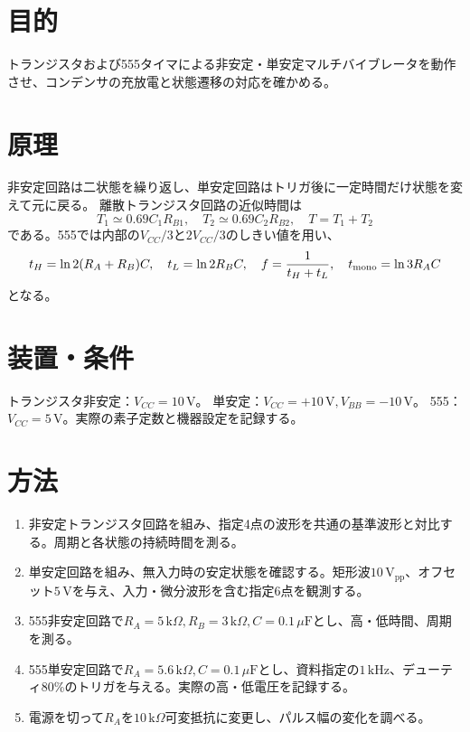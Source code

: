 \documentclass[lualatex,a4paper,10pt]{jlreq}
\begin{document}
\reporttitle
{}

\section{目的}\label{sec:auto1}
トランジスタおよび555タイマによる非安定・単安定マルチバイブレータを動作させ、コンデンサの充放電と状態遷移の対応を確かめる。
\section{原理}\label{sec:auto2}
非安定回路は二状態を繰り返し、単安定回路はトリガ後に一定時間だけ状態を変えて元に戻る。
離散トランジスタ回路の近似時間は
\[
 T_1\simeq0.69C_1R_{B1},\quad T_2\simeq0.69C_2R_{B2},
 \quad T=T_1+T_2
\]
である。555では内部の$V_{CC}/3$と$2V_{CC}/3$のしきい値を用い、
\[
 t_H=\ln2(R_A+R_B)C,\quad t_L=\ln2R_BC,\quad
 f=\frac1{t_H+t_L},\quad t_{\rm mono}=\ln3R_AC
\]
となる。
\section{装置・条件}\label{sec:auto3}
トランジスタ非安定：$V_{CC}=10\,\mathrm{V}$。
単安定：$V_{CC}=+10\,\mathrm{V},V_{BB}=-10\,\mathrm{V}$。
555：$V_{CC}=5\,\mathrm{V}$。実際の素子定数と機器設定を記録する。
\writing{16mm}
\section{方法}\label{sec:auto4}
\begin{enumerate}
\item 非安定トランジスタ回路を組み、指定4点の波形を共通の基準波形と対比する。周期と各状態の持続時間を測る。
\item 単安定回路を組み、無入力時の安定状態を確認する。矩形波$10\,\mathrm{V_{pp}}$、オフセット$5\,\mathrm{V}$を与え、入力・微分波形を含む指定6点を観測する。
\item 555非安定回路で$R_A=5\,\mathrm{k}\Omega,R_B=3\,\mathrm{k}\Omega,C=0.1\,\mu\mathrm{F}$とし、高・低時間、周期を測る。
\item 555単安定回路で$R_A=5.6\,\mathrm{k}\Omega,C=0.1\,\mu\mathrm{F}$とし、資料指定の$1\,\mathrm{kHz}$、デューティ80\%のトリガを与える。実際の高・低電圧を記録する。
\item 電源を切って$R_A$を$10\,\mathrm{k}\Omega$可変抵抗に変更し、パルス幅の変化を調べる。
\end{enumerate}
\clearpage
\end{document}
